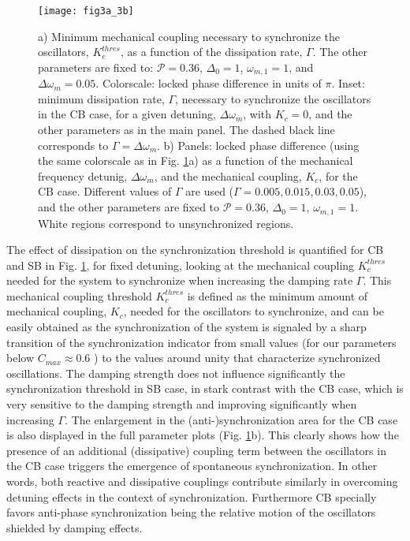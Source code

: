 \documentclass[a4paper]{jpconf}
\begin{document}
\begin{figure}[H]
 \centering
 \texttt{[image: fig3a\_3b]}
 \caption{\label{figurethree}   a) Minimum mechanical coupling 
necessary to synchronize the oscillators, $K_c^{thres}$, as a function of the 
dissipation rate, $\Gamma$. The other parameters are fixed to: $\mathcal{P}=0.36$, 
$\Delta_0=1$, $\omega_{m,1}=1$, and $\Delta\omega_m=0.05$. Colorscale: locked phase difference in units of $\pi$. Inset: minimum dissipation rate, $\Gamma$,
necessary to synchronize the oscillators  in the CB case, for a given 
detuning, $\Delta\omega_m$, with $K_c=0$, and the other parameters as in the main panel. The dashed black line corresponds to $\Gamma=\Delta\omega_m$.
 b) Panels: locked phase difference (using the same colorscale as in Fig. \ref{figurethree}a) as a function of the mechanical frequency detunig, 
$\Delta\omega_m$, and the mechanical coupling, $K_c$, for the CB case. Different values of $\Gamma$ are used 
($\Gamma=0.005,0.015,0.03,0.05$), and the other parameters are fixed to $\mathcal{P}=0.36$, 
$\Delta_0=1$, $\omega_{m,1}=1$. White regions correspond to unsynchronized regions.}
\end{figure}


The effect of dissipation on the synchronization threshold is quantified for CB and SB in Fig. \ref{figurethree}, for fixed 
  detuning, looking at the mechanical coupling $K_c^{thres}$ needed for the system to synchronize when increasing the damping rate $\Gamma$. 
   This mechanical coupling threshold $K_c^{thres}$ is defined as the minimum amount of mechanical coupling, $K_c$, needed for the oscillators to synchronize,
  and can be easily obtained as the synchronization of the system is signaled by a sharp transition of the synchronization indicator from small values 
  (for our parameters below $C_{max}\approx0.6$ )  to the values around unity that characterize synchronized oscillations.
 The damping strength does not influence significantly the synchronization threshold in SB case, in stark contrast with the CB case,  which is
 very sensitive to the damping strength and improving significantly when increasing $\Gamma$. The enlargement in the (anti-)synchronization area  for the CB case
 is also displayed in the full parameter plots (Fig. \ref{figurethree}b). 
 This clearly shows  how  the presence of an additional (dissipative) coupling term between the oscillators
 in the CB case triggers the emergence of spontaneous synchronization. In other words,
 both reactive and dissipative couplings contribute similarly in overcoming detuning effects in the context of synchronization.
 Furthermore CB specially favors anti-phase synchronization
 being the relative motion of the oscillators shielded by damping effects.
 
\end{document}
